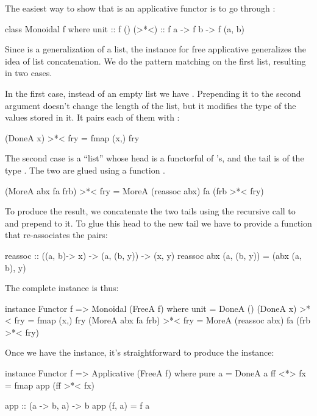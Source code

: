 \documentclass[DaoFP]{subfiles}
\begin{document}
The easiest way to show that  is an applicative functor is to go through :
\begin{haskell}
class Monoidal f where
  unit  :: f ()
  (>*<) :: f a -> f b -> f (a, b)
\end{haskell}

Since  is a generalization of a list, the  instance for free applicative generalizes the idea of list concatenation. We do the pattern matching on the first list, resulting in two cases.

In the first case, instead of an empty list we have . Prepending it to the second argument doesn't change the length of the list, but it modifies the type of the values stored in it. It pairs each of them with :
\begin{haskell}
  (DoneA x) >*< fry = fmap (x,) fry
\end{haskell}

The second case is a ``list'' whose head  is a functorful of 's, and the tail  is of the type . The two are glued using a function . 
\begin{haskell}
  (MoreA abx fa frb) >*< fry = MoreA (reassoc abx) fa (frb >*< fry)
\end{haskell}
To produce the result, we concatenate the two tails using the recursive call to \hask{>*<} and prepend  to it. To glue this head to the new tail we have to provide a function that re-associates the pairs:
\begin{haskell}
reassoc :: ((a, b)-> x) -> (a, (b, y)) -> (x, y)
reassoc abx (a, (b, y)) = (abx (a, b), y)
\end{haskell}

The complete instance is thus:
\begin{haskell}
instance Functor f => Monoidal (FreeA f) where
  unit = DoneA ()
  (DoneA x) >*< fry = fmap (x,) fry
  (MoreA abx fa frb) >*< fry = MoreA (reassoc abx) fa (frb >*< fry)
\end{haskell}

Once we have the  instance, it's straightforward to produce the  instance:
\begin{haskell}
instance Functor f => Applicative (FreeA f) where
  pure a = DoneA a
  ff <*> fx = fmap app (ff >*< fx)
  
app :: (a -> b, a) -> b
app (f, a) = f a
\end{haskell}
\end{document}
